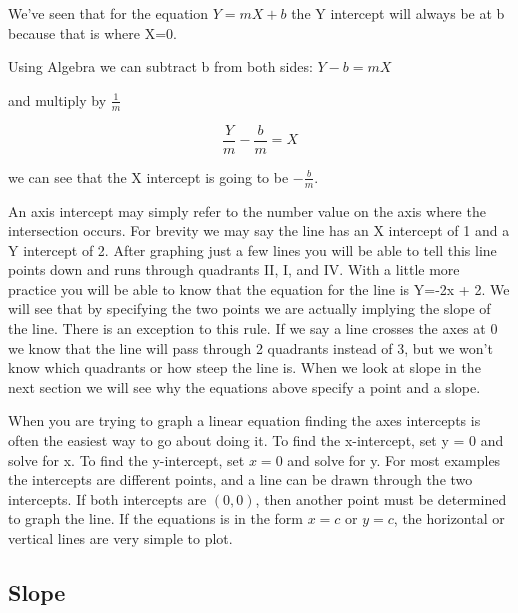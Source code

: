 We've seen that for the equation $Y=mX + b$ the Y intercept will always be at b because
that is where X=0.



Using Algebra we can subtract b from both sides: $Y - b = mX$



and multiply by $\frac {1}{m}$



$$\frac {Y}{m} - \frac {b}{m} = X$$



we can see that the X intercept is going to be $-\frac{b}{m}$.



An axis intercept may simply refer to the number value on the axis where the intersection
occurs. For brevity we may say the line has an X intercept of 1 and a Y intercept of 2.
After graphing just a few lines you will be able to tell this line points down and runs
through quadrants II, I, and IV. With a little more practice you will be able to know that
the equation for the line is Y=-2x + 2. We will see that by specifying the two points we
are actually implying the slope of the line. There is an exception to this rule. If we say
a line crosses the axes at 0 we know that the line will pass through 2 quadrants instead
of 3, but we won't know which quadrants or how steep the line is. When we look at slope in
the next section we will see why the equations above specify a point and a slope.



When you are trying to graph a linear equation finding the axes intercepts is often the
easiest way to go about doing it. To find the x-intercept, set y = 0 and solve for x. To
find the y-intercept, set $x = 0$ and solve for y. For most examples the intercepts are
different points, and a line can be drawn through the two intercepts. If both intercepts
are $(0,0)$, then another point must be determined to graph the line. If the equations is
in the form $x = c$ or $y = c$, the horizontal or vertical lines are very simple to plot.




\subsection{Slope}
\label{sss:slop-0bbe}




